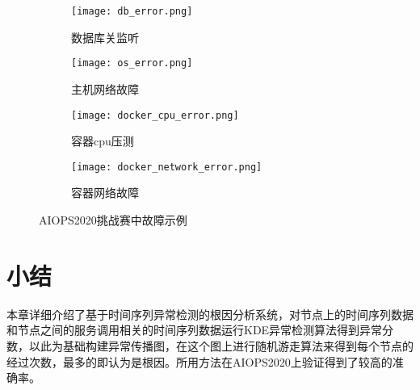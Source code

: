 \begin{figure}[htbp]
  \centering
  \begin{subfigure}[b]{\textwidth}
    \begin{minipage}[t]{0.5\linewidth}
      \centering
      \texttt{[image: db\_error.png]}
      \caption{数据库关监听}
      \label{fig:error:db}
    \end{minipage}
    \begin{minipage}[t]{0.5\linewidth}
      \centering
      \texttt{[image: os\_error.png]}
      \caption{主机网络故障}
      \label{fig:error:os}
    \end{minipage}
  \end{subfigure}

  \begin{subfigure}[b]{\textwidth}
    \begin{minipage}[t]{0.5\linewidth}
      \centering
      \texttt{[image: docker\_cpu\_error.png]}
      \caption{容器cpu压测}
      \label{fig:error:docker}
    \end{minipage}
    \begin{minipage}[t]{0.5\linewidth}
      \centering
      \texttt{[image: docker\_network\_error.png]}
      \caption{容器网络故障}
      \label{fig:error:docker:network}
    \end{minipage}
  \end{subfigure}
  \caption{AIOPS2020挑战赛中故障示例}
  \label{fig:error:example}
\end{figure}

\section{小结}
本章详细介绍了基于时间序列异常检测的根因分析系统，对节点上的时间序列数据和节点之间的服务调用相关的时间序列数据运行KDE异常检测算法得到异常分数，以此为基础构建异常传播图，在这个图上进行随机游走算法来得到每个节点的经过次数，最多的即认为是根因。所用方法在AIOPS2020上验证得到了较高的准确率。